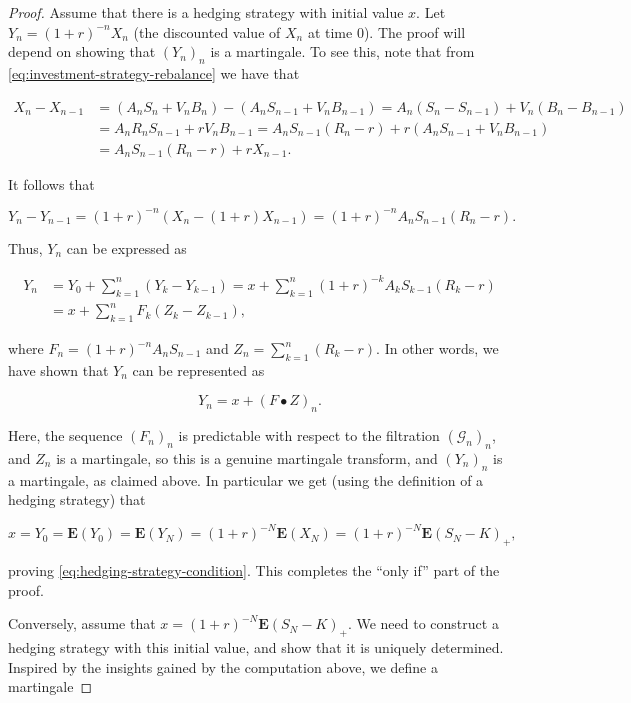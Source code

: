 \documentclass[11pt]{report}
\theoremstyle{plain}
\theoremstyle{definition}
\begin{document}
\begin{proof}
Assume that there is a hedging strategy with initial
value $x$. Let $Y_n = (1+r)^{-n} X_n$ (the discounted
value of $X_n$ at time $0$). The proof will depend on
showing that $(Y_n)_n$ is a martingale. To see this,
note that from \eqref{eq:investment-strategy-rebalance} we
have that

\begin{align*}
X_n - X_{n-1} &= (A_n S_n + V_n B_n) - (A_n S_{n-1} + V_n B_{n-1})
= A_n (S_n-S_{n-1}) + V_n (B_n-B_{n-1}) \\
&= A_n R_n S_{n-1} + r V_n B_{n-1} = A_n S_{n-1}(R_n-r) + r(A_n S_{n-1} + V_n B_{n-1}) \\
&= A_n S_{n-1} (R_n-r) + r X_{n-1}.
\end{align*}

\noindent It follows that

\[
Y_n-Y_{n-1} = (1+r)^{-n}(X_n-(1+r)X_{n-1}) = (1+r)^{-n}A_n S_{n-1}(R_n-r).
\]

\noindent Thus, $Y_n$ can be expressed as

\begin{align*}
Y_n &= Y_0 + \sum_{k=1}^n (Y_k-Y_{k-1}) =
x + \sum_{k=1}^n (1+r)^{-k}A_k S_{k-1} (R_k-r) \\
&= x + \sum_{k=1}^n F_k (Z_k-Z_{k-1}),
\end{align*}

\noindent where $F_n = (1+r)^{-n} A_n S_{n-1}$ and
$Z_n = \sum_{k=1}^n (R_k-r)$. In other words, we have
shown that $Y_n$ can be represented as

\[
Y_n = x + (F\bullet Z)_n.
\]

\noindent Here, the sequence $(F_n)_n$ is predictable with
respect to the filtration $(\mathcal{G}_n)_n$, and
$Z_n$ is a martingale, so this is a genuine
martingale transform, and $(Y_n)_n$ is a martingale,
as claimed above. In particular we get (using the
definition of a hedging strategy) that

\[
x = Y_0 = \mathbf{E}(Y_0) = \mathbf{E}(Y_N) = (1+r)^{-N} \mathbf{E}(X_N) = (1+r)^{-N} \mathbf{E}(S_N-K)_+,
\]

\noindent proving \eqref{eq:hedging-strategy-condition}. This
completes the ``only if'' part of the proof.

Conversely, assume that
$x=(1+r)^{-N} \mathbf{E}(S_N-K)_+$. We need to
construct a hedging strategy with this initial value,
and show that it is uniquely determined. Inspired by
the insights gained by the computation above, we
define a martingale


\end{proof}
\end{document}
